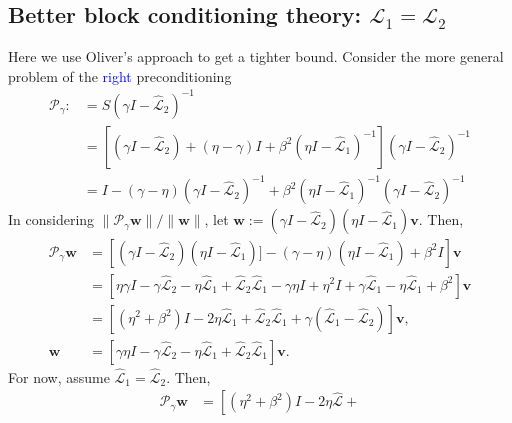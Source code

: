 \documentclass[a4paper,10pt]{article}
\newcommand{\tcb}{\textcolor{blue}}
\begin{document}
{%
\subsection{Better block conditioning theory: $\mathcal{L}_1 = \mathcal{L}_2$}

Here we use Oliver's approach to get a tighter bound.
Consider the more general problem of the \tcb{right} preconditioning 
%
\begin{align}\nonumber
\mathcal{P}_\gamma :&=
S(\gamma I- \widehat{\mathcal{L}}_2)^{-1} \\
& = \left[ (\gamma I - \widehat{\mathcal{L}}_2) + (\eta-\gamma)I +
	\beta^2 (\eta I - \widehat{\mathcal{L}}_1)^{-1}\right]
	(\gamma I - \widehat{\mathcal{L}}_2)^{-1} \\
& = I - (\gamma - \eta)( \gamma I- \widehat{\mathcal{L}}_2)^{-1} + 
	\beta^2( \eta I-\widehat{\mathcal{L}}_1)^{-1}
	( \gamma I- \widehat{\mathcal{L}}_2)^{-1}\nonumber
\end{align}
%
In considering $\|\mathcal{P}_\gamma\mathbf{w}\|/\|\mathbf{w}\|$, let $\mathbf{w}:= 
(\gamma I- \widehat{\mathcal{L}}_2)(\eta I-\widehat{\mathcal{L}}_1)\mathbf{v}$.
Then,
%
\begin{align*}
\mathcal{P}_\gamma\mathbf{w} & = \left[
	(\gamma I- \widehat{\mathcal{L}}_2)(\eta I-\widehat{\mathcal{L}}_1) ]
	 - (\gamma - \eta)(\eta I-\widehat{\mathcal{L}}_1) + \beta^2 I\right]\mathbf{v} \\
& = \left[\eta\gamma I - \gamma\widehat{\mathcal{L}}_2 - \eta \widehat{\mathcal{L}}_1
	+ \widehat{\mathcal{L}}_2\widehat{\mathcal{L}}_1 - \gamma\eta I + \eta^2 I
	+ \gamma \widehat{\mathcal{L}}_1 - \eta \widehat{\mathcal{L}}_1 + \beta^2\right]\mathbf{v} \\
& = \left[ (\eta^2+\beta^2) I - 2\eta \widehat{\mathcal{L}}_1 +
	\widehat{\mathcal{L}}_2\widehat{\mathcal{L}}_1 +
	\gamma (\widehat{\mathcal{L}}_1 - \widehat{\mathcal{L}}_2) \right]\mathbf{v}, \\
\mathbf{w} & = \left[ \gamma\eta I - \gamma\widehat{\mathcal{L}}_2 -
	\eta \widehat{\mathcal{L}}_1 +
	\widehat{\mathcal{L}}_2\widehat{\mathcal{L}}_1 \right]\mathbf{v}.
\end{align*}
%
For now, assume $ \widehat{\mathcal{L}}_1 = \widehat{\mathcal{L}}_2$. Then,
%
\begin{align*}
\mathcal{P}_\gamma\mathbf{w} & = \left[ (\eta^2+\beta^2) I - 2\eta \widehat{\mathcal{L}} +

\end{align*}}
\end{document}
